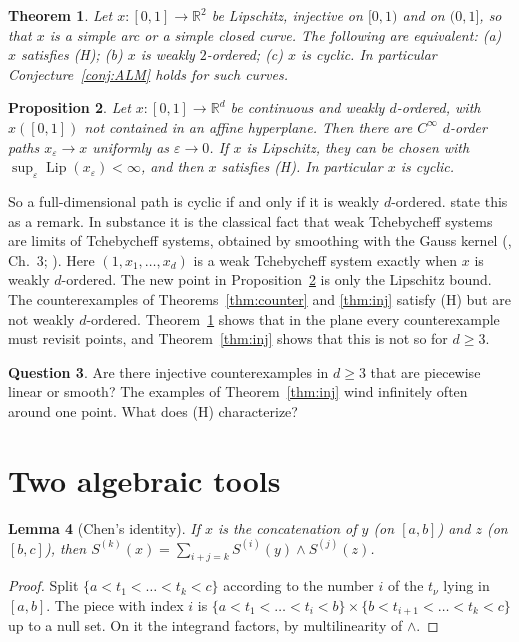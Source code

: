\documentclass[11pt]{amsart}
\newtheorem{theorem}{Theorem}
\newtheorem{proposition}[theorem]{Proposition}
\newtheorem{lemma}[theorem]{Lemma}
\theoremstyle{definition}
\newtheorem{question}[theorem]{Question}
\newcommand{\R}{\mathbb{R}}
\begin{document}
\begin{theorem}\label{thm:planar}
Let $x:[0,1]\to\R^2$ be Lipschitz, injective on $[0,1)$ and on $(0,1]$, so that $x$ is a simple arc or a simple closed curve.
The following are equivalent: (a) $x$ satisfies (H); (b) $x$ is weakly $2$-ordered; (c) $x$ is cyclic.
In particular Conjecture~\ref{conj:ALM} holds for such curves.
\end{theorem}

\begin{proposition}\label{prop:smooth}
Let $x:[0,1]\to\R^d$ be continuous and weakly $d$-ordered, with $x([0,1])$ not contained in an affine hyperplane.
Then there are $C^\infty$ $d$-order paths $x_\varepsilon\to x$ uniformly as $\varepsilon\to0$.
If $x$ is Lipschitz, they can be chosen with $\sup_\varepsilon\operatorname{Lip}(x_\varepsilon)<\infty$, and then $x$ satisfies (H).
In particular $x$ is cyclic.
\end{proposition}

So a full-dimensional path is cyclic if and only if it is weakly $d$-ordered. \cite{ALM} state this as a remark. In substance it is the classical fact that weak
Tchebycheff systems are limits of Tchebycheff systems, obtained by smoothing with the Gauss kernel (\cite{K}, Ch.~3; \cite{Z}). Here $(1,x_1,\dots,x_d)$ is a weak Tchebycheff
system exactly when $x$ is weakly $d$-ordered. The new point in Proposition~\ref{prop:smooth} is only the Lipschitz bound. The counterexamples of Theorems~\ref{thm:counter} and
\ref{thm:inj} satisfy (H) but are not weakly $d$-ordered. Theorem~\ref{thm:planar} shows that in the plane every counterexample must revisit points, and
Theorem~\ref{thm:inj} shows that this is not so for $d\ge3$.

\begin{question}\label{q:inj}
Are there injective counterexamples in $d\ge3$ that are piecewise linear or smooth? The examples of Theorem~\ref{thm:inj} wind infinitely often around one point.
What does (H) characterize?
\end{question}

\section{Two algebraic tools}

\begin{lemma}[Chen's identity]\label{lem:chen}
If $x$ is the concatenation of $y$ (on $[a,b]$) and $z$ (on $[b,c]$), then
$S^{(k)}(x)=\sum_{i+j=k}S^{(i)}(y)\wedge S^{(j)}(z)$.
\end{lemma}
\begin{proof}
Split $\{a<t_1<\dots<t_k<c\}$ according to the number $i$ of the $t_\nu$ lying in $[a,b]$. The piece with index $i$ is
$\{a<t_1<\dots<t_i<b\}\times\{b<t_{i+1}<\dots<t_k<c\}$ up to a null set. On it the integrand factors, by multilinearity of $\wedge$.
\end{proof}
\end{document}
